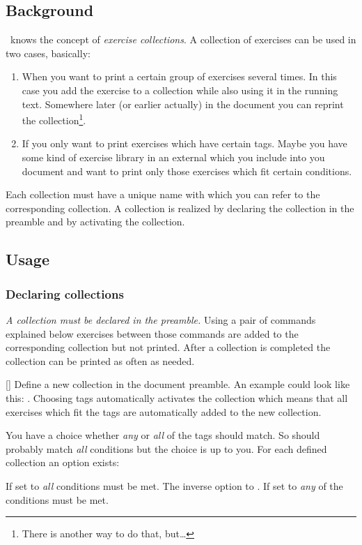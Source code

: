 \documentclass{xsim-manual}
\begin{document}
\subsection{Background}
\xsim\ knows the concept of \emph{exercise collections}.  A collection of
exercises can be used in two cases, basically:
\begin{enumerate}
  \item When you want to print a certain group of exercises several times. In
    this case you add the exercise to a collection while also using it in the
    running text. Somewhere later (or earlier actually) in the document you
    can reprint the collection\footnote{There is another way to do that,
      but\dots}.
  \item If you only want to print exercises which have certain tags.  Maybe
    you have some kind of exercise library in an external which you include
    into you document and want to print only those exercises which fit
    certain conditions.
\end{enumerate}
Each collection must have a unique name with which you can refer to the
corresponding collection.  A collection is realized by declaring the
collection in the preamble and by activating the collection.

\subsection{Usage}
\subsubsection{Declaring collections}
\emph{A collection must be declared in the preamble.}  Using a pair of
commands explained below exercises between those commands are added to the
corresponding collection but not printed.  After a collection is completed the
collection can be printed as often as needed.
\begin{commands}
  []
    Define a new collection  in the document preamble.
    An example could look like this:
    .
    Choosing tags automatically activates the collection which means that all
    exercises which fit the tags are automatically added to the new
    collection.
\end{commands}
You have a choice whether \emph{any} or \emph{all} of the
tags should match. So  should probably match
\emph{all} conditions but the choice is up to you. For each defined collection
an option exists:
\begin{options}
    If set to  \emph{all} conditions must be met.
    The inverse option to . If set to  \emph{any} of
    the conditions must be met.
\end{options}
\end{document}
